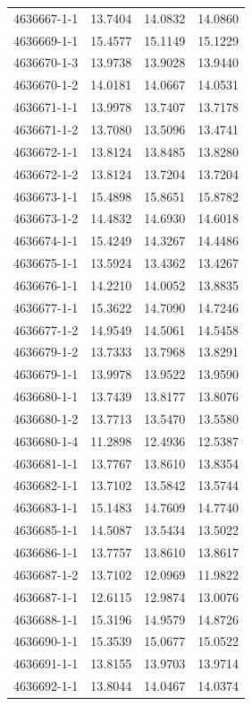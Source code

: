 \begin{longtable}{lrrr}
4636667-1-1 & 13.7404 & 14.0832 & 14.0860 \\
4636669-1-1 & 15.4577 & 15.1149 & 15.1229 \\
4636670-1-3 & 13.9738 & 13.9028 & 13.9440 \\
4636670-1-2 & 14.0181 & 14.0667 & 14.0531 \\
4636671-1-1 & 13.9978 & 13.7407 & 13.7178 \\
4636671-1-2 & 13.7080 & 13.5096 & 13.4741 \\
4636672-1-1 & 13.8124 & 13.8485 & 13.8280 \\
4636672-1-2 & 13.8124 & 13.7204 & 13.7204 \\
4636673-1-1 & 15.4898 & 15.8651 & 15.8782 \\
4636673-1-2 & 14.4832 & 14.6930 & 14.6018 \\
4636674-1-1 & 15.4249 & 14.3267 & 14.4486 \\
4636675-1-1 & 13.5924 & 13.4362 & 13.4267 \\
4636676-1-1 & 14.2210 & 14.0052 & 13.8835 \\
4636677-1-1 & 15.3622 & 14.7090 & 14.7246 \\
4636677-1-2 & 14.9549 & 14.5061 & 14.5458 \\
4636679-1-2 & 13.7333 & 13.7968 & 13.8291 \\
4636679-1-1 & 13.9978 & 13.9522 & 13.9590 \\
4636680-1-1 & 13.7439 & 13.8177 & 13.8076 \\
4636680-1-2 & 13.7713 & 13.5470 & 13.5580 \\
4636680-1-4 & 11.2898 & 12.4936 & 12.5387 \\
4636681-1-1 & 13.7767 & 13.8610 & 13.8354 \\
4636682-1-1 & 13.7102 & 13.5842 & 13.5744 \\
4636683-1-1 & 15.1483 & 14.7609 & 14.7740 \\
4636685-1-1 & 14.5087 & 13.5434 & 13.5022 \\
4636686-1-1 & 13.7757 & 13.8610 & 13.8617 \\
4636687-1-2 & 13.7102 & 12.0969 & 11.9822 \\
4636687-1-1 & 12.6115 & 12.9874 & 13.0076 \\
4636688-1-1 & 15.3196 & 14.9579 & 14.8726 \\
4636690-1-1 & 15.3539 & 15.0677 & 15.0522 \\
4636691-1-1 & 13.8155 & 13.9703 & 13.9714 \\
4636692-1-1 & 13.8044 & 14.0467 & 14.0374 \\

\end{longtable}
